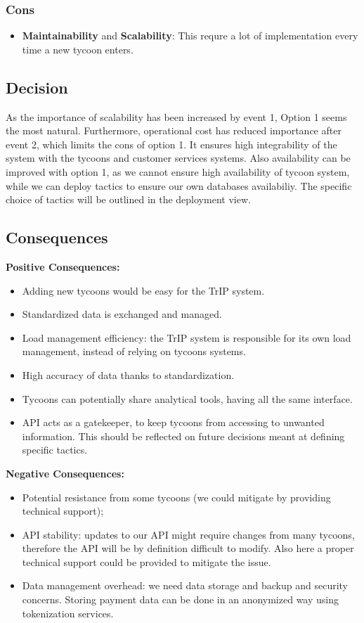 \subsubsection*{Cons}
\begin{itemize}[noitemsep]
    \item \textbf{Maintainability} and \textbf{Scalability}: This requre a lot of implementation every time a new tycoon enters.
\end{itemize}

\subsection*{Decision}
As the importance of scalability has been increased by event 1, Option 1 seems the most natural.
Furthermore, operational cost has reduced importance after event 2, which limits the cons of option 1.
It ensures high integrability of the system with the tycoons and customer services systems.
Also availability can be improved with option 1, as we cannot ensure high availability of tycoon system, while we can deploy tactics to ensure our own databases availabiliy. The specific choice of tactics will be outlined in the deployment view.

\subsection*{Consequences}
\textbf{Positive Consequences:}
\begin{itemize}
    \item Adding new tycoons would be easy for the TrIP system.
    \item Standardized data is exchanged and managed.
    \item Load management efficiency: the TrIP system is responsible for its own load management, instead of relying on tycoons systems.
    \item High accuracy of data thanks to standardization.
    \item Tycoons can potentially share analytical tools, having all the same interface.
    \item API acts as a gatekeeper, to keep tycoons from accessing to unwanted information. This should be reflected on future decisions meant at defining specific tactics.
\end{itemize}
\textbf{Negative Consequences:}
\begin{itemize}
    \item Potential resistance from some tycoons (we could mitigate by providing technical support);
    \item API stability: updates to our API might require changes from many tycoons, therefore the API will be by definition difficult to modify. Also here a proper technical support could be provided to mitigate the issue.
    \item Data management overhead: we need data storage and backup and security concerns. Storing payment data can be done in an anonymized way using tokenization services.
\end{itemize}